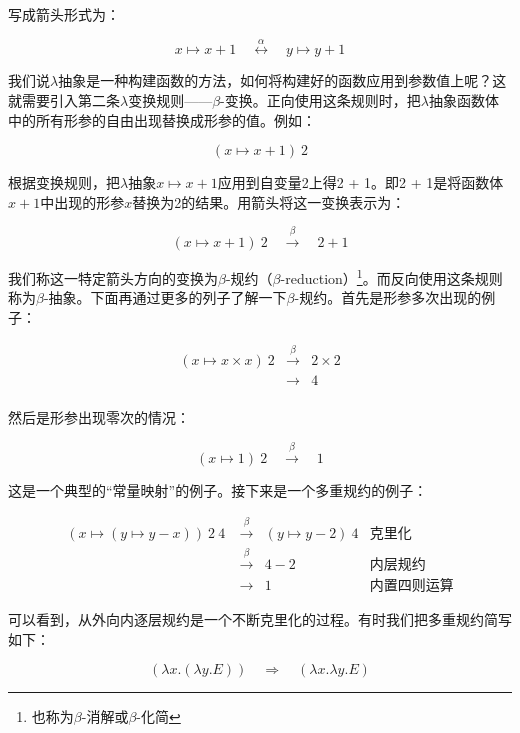 \documentclass{article}
\begin{document}

写成箭头形式为：

\[
x \mapsto x + 1 \quad \overset{\alpha}{\longleftrightarrow} \quad y \mapsto y + 1
\]

我们说$\lambda$抽象是一种构建函数的方法，如何将构建好的函数应用到参数值上呢？这就需要引入第二条$\lambda$变换规则——$\beta$-变换。正向使用这条规则时，把$\lambda$抽象函数体中的所有形参的自由出现替换成形参的值。例如：

\[
(x \mapsto x + 1)\ 2
\]

根据变换规则，把$\lambda$抽象$x \mapsto x + 1$应用到自变量2上得2 + 1。即2 + 1是将函数体$x + 1$中出现的形参$x$替换为2的结果。用箭头将这一变换表示为：

\[
(x \mapsto x + 1)\ 2 \quad \overset{\beta}{\longrightarrow} \quad 2 + 1
\]

我们称这一特定箭头方向的变换为$\beta$-规约（$\beta$-reduction）\footnote{也称为$\beta$-消解或$\beta$-化简}。而反向使用这条规则称为$\beta$-抽象。下面再通过更多的列子了解一下$\beta$-规约。首先是形参多次出现的例子：

\[
\begin{array}{rcl}
(x \mapsto x \times x)\ 2 & \overset{\beta}{\longrightarrow} & 2 \times 2 \\
                          & \longrightarrow & 4 \\
\end{array}
\]

然后是形参出现零次的情况：

\[
(x \mapsto 1)\ 2 \quad \overset{\beta}{\longrightarrow} \quad 1
\]

这是一个典型的“常量映射”的例子。接下来是一个多重规约的例子：

\[
\begin{array}{rcll}
(x \mapsto (y \mapsto y - x))\ 2\ 4\ & \overset{\beta}{\longrightarrow} & (y \mapsto y - 2)\ 4 & \text{克里化} \\
                                     & \overset{\beta}{\longrightarrow} & 4 - 2 & \text{内层规约} \\
                                     & \longrightarrow & 1 & \text{内置四则运算}
\end{array}
\]

可以看到，从外向内逐层规约是一个不断克里化的过程。有时我们把多重规约简写如下：

\[
(\lambda x . (\lambda y . E)) \quad \Rightarrow \quad (\lambda x . \lambda y . E)
\]
\end{document}
